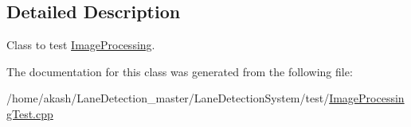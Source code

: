 \subsection{Detailed Description}
Class to test \hyperlink{classImageProcessing}{Image\+Processing}. 

The documentation for this class was generated from the following file\+:\begin{DoxyCompactItemize}
\item 
/home/akash/\+Lane\+Detection\+\_\+master/\+Lane\+Detection\+System/test/\hyperlink{ImageProcessingTest_8cpp}{Image\+Processing\+Test.\+cpp}\end{DoxyCompactItemize}
